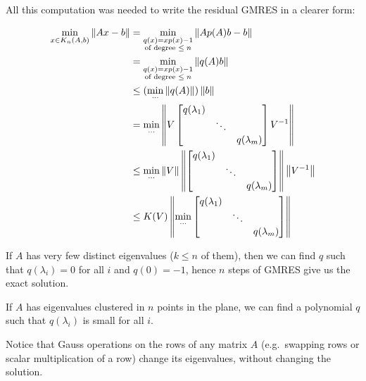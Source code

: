 \documentclass[ComputationalMathematics.tex]{subfiles}
\begin{document}
All this computation was needed to write the residual GMRES in a clearer form:

\begin{equation}
  \begin{aligned}
    \min\limits_{x\in K_n(A,b)}\left\lVert Ax-b\right\rVert
    &= \min_{\substack{q(x)=xp(x)-1\\\text{of degree $\leq n$}}}\left\lVert Ap(A)b-b\right\rVert\\
    &= \min_{\substack{q(x)=xp(x)-1\\\text{of degree $\leq n$}}}\left\lVert q(A)b\right\rVert\\
    &\le (\min\limits_{\cdots}\left\lVert q(A)\right\rVert) \left\lVert b\right\rVert\\
    &= \min\limits_{\cdots}\left\lVert V\begin{bmatrix}
    q(\lambda_1)\\
    & \ddots \\
    & & q(\lambda_m)
    \end{bmatrix}V^{-1}\right\rVert\\
    &\le \min\limits_{\cdots}\left\lVert V\right\rVert \left\lVert\begin{bmatrix}
    q(\lambda_1)\\
    & \ddots \\
    & & q(\lambda_m)
    \end{bmatrix}\right\rVert \left\lVert{V}^{-1}\right\rVert\\ 
    &\le
    K(V) \left\lVert\min\limits_{\cdots} \begin{bmatrix}
    q(\lambda_1)\\
    & \ddots \\
    & & q(\lambda_m)
    \end{bmatrix}\right\rVert 
  \end{aligned}
\end{equation}

If $A$ has very few distinct eigenvalues ($k\leq n$ of them), then we can find $q$ such that $q(\lambda_i)=0$ for all $i$ and $q(0) = -1$, hence $n$ steps of GMRES give us the exact solution.

If $A$ has eigenvalues clustered in $n$ points in the plane, we can find a polynomial $q$ such that $q(\lambda_i)$ is small for all $i$.


Notice that Gauss operations on the rows of any matrix $A$ (e.g.~swapping rows or scalar multiplication of a row) change its eigenvalues, without changing the solution.
\end{document}
